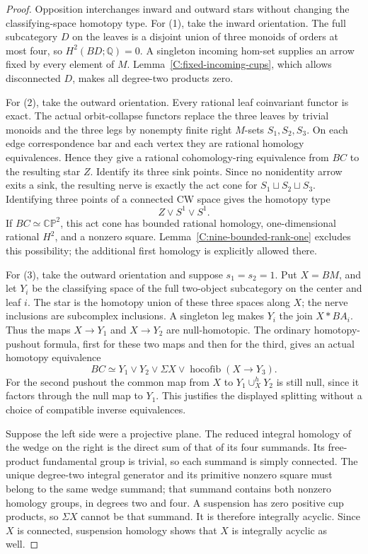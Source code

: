 \begin{proof}
Opposition interchanges inward and outward stars without changing
the classifying-space homotopy type.  For (1), take the inward
orientation.  The full subcategory $D$ on the leaves is a
disjoint union of three monoids of orders at most four, so
$H^2(BD;\mathbb Q)=0$.  A singleton incoming hom-set supplies
an arrow fixed by every element of $M$.
Lemma~\ref{C:fixed-incoming-cups}, which allows disconnected
$D$, makes all degree-two products zero.

For (2), take the outward orientation.  Every rational leaf
coinvariant functor is exact.  The actual orbit-collapse
functors replace the three leaves by trivial monoids and the
three legs by nonempty finite right $M$-sets $S_1,S_2,S_3$.
On each edge correspondence bar and each vertex they are
rational homology equivalences.  Hence they give a rational
cohomology-ring equivalence from $BC$ to the resulting star
$Z$.  Identify its three sink points.  Since no nonidentity
arrow exits a sink, the resulting nerve is exactly the act
cone for $S_1\sqcup S_2\sqcup S_3$.  Identifying three points
of a connected CW space gives the homotopy type
\[
 Z\vee S^1\vee S^1.
\]
If $BC\simeq\mathbb {CP}^2$, this act cone has bounded rational
homology, one-dimensional rational $H^2$, and a nonzero square.
Lemma~\ref{C:nine-bounded-rank-one} excludes this possibility;
the additional first homology is explicitly allowed there.

For (3), take the outward orientation and suppose $s_1=s_2=1$.
Put $X=BM$, and let $Y_i$ be the classifying space of the full
two-object subcategory on the center and leaf $i$.  The star
is the homotopy union of these three spaces along $X$; the
nerve inclusions are subcomplex inclusions.  A singleton leg
makes $Y_i$ the join $X*BA_i$.  Thus the maps $X\to Y_1$ and
$X\to Y_2$ are null-homotopic.  The ordinary homotopy-pushout
formula, first for these two maps and then for the third,
gives an actual homotopy equivalence
\begin{equation}\label{C:four-star-two-singleton-splitting}
 BC\simeq Y_1\vee Y_2\vee\Sigma X
       \vee\operatorname{hocofib}(X\longrightarrow Y_3).
\end{equation}
For the second pushout the common map from $X$ to
$Y_1\cup_X^hY_2$ is still null, since it factors through
the null map to $Y_1$.  This justifies the displayed splitting
without a choice of compatible inverse equivalences.

Suppose the left side were a projective plane.  The reduced
integral homology of the wedge on the right is the direct sum
of that of its four summands.  Its free-product fundamental
group is trivial, so each summand is simply connected.  The
unique degree-two integral generator and its primitive
nonzero square must belong to the same wedge summand; that
summand contains both nonzero homology groups, in degrees
two and four.  A suspension has zero positive cup products,
so $\Sigma X$ cannot be that summand.  It is therefore integrally
acyclic.  Since $X$ is connected, suspension homology shows
that $X$ is integrally acyclic as well.


\end{proof}
